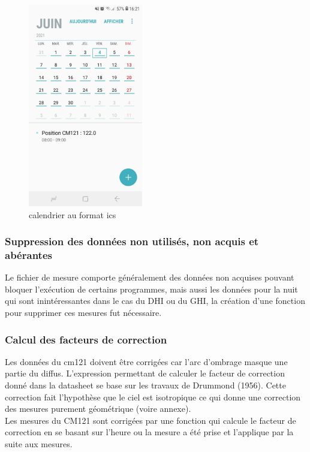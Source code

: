 \documentclass[12pt,a4paper]{article}
\begin{document}
\begin{flushleft}
\begin{figure}[H]
\centering
\includegraphics[width=5cm]{image/calendrier/4.jpg} 
\caption{calendrier au format ics}  
\end{figure}


\subsubsection{Suppression des données non utilisés, non acquis et abérantes}

Le fichier de mesure comporte généralement des données non acquises pouvant bloquer l'exécution de certains programmes, mais aussi les données pour la nuit qui sont inintéressantes dans le cas du DHI ou du GHI, la création d'une fonction pour supprimer ces mesures fut nécessaire.

\subsubsection{Calcul des facteurs de correction}

Les données du cm121 doivent être corrigées car l'arc d'ombrage masque une partie du diffus. L'expression permettant de calculer le facteur de correction donné dans la datasheet se base sur les travaux de Drummond (1956). Cette correction fait l'hypothèse que le ciel est isotropique ce qui donne une correction des mesures purement géométrique (voire annexe).\\

Les mesures du CM121 sont corrigées par une fonction qui calcule le facteur de correction en se basant sur l'heure ou la mesure a été prise et l'applique par la suite aux mesures.


\end{flushleft}
\end{document}
